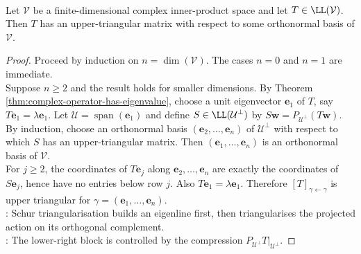 \begin{theorem} \label{thm:schur-triangularization} \\
Let $\mathcal{V}$ be a finite-dimensional complex inner-product space and let $T\in\LL(\mathcal{V})$. Then $T$ has an upper-triangular matrix with respect to some orthonormal basis of $\mathcal{V}$.
\begin{proof}
Proceed by induction on $n=\dim(\mathcal{V})$. The cases $n=0$ and $n=1$ are immediate.\\
Suppose $n\geq2$ and the result holds for smaller dimensions. By Theorem \ref{thm:complex-operator-has-eigenvalue}, choose a unit eigenvector $\mathbf{e}_1$ of $T$, say $T\mathbf{e}_1=\lambda\mathbf{e}_1$. Let $\mathcal{U}=\operatorname{span}(\mathbf{e}_1)$ and define $S\in\LL(\mathcal{U}^{\perp})$ by $S\mathbf{w}=P_{\mathcal{U}^{\perp}}(T\mathbf{w})$.\\
By induction, choose an orthonormal basis $(\mathbf{e}_2,\ldots,\mathbf{e}_n)$ of $\mathcal{U}^{\perp}$ with respect to which $S$ has an upper-triangular matrix. Then $(\mathbf{e}_1,\ldots,\mathbf{e}_n)$ is an orthonormal basis of $\mathcal{V}$.\\
For $j\geq2$, the coordinates of $T\mathbf{e}_j$ along $\mathbf{e}_2,\ldots,\mathbf{e}_n$ are exactly the coordinates of $S\mathbf{e}_j$, hence have no entries below row $j$. Also $T\mathbf{e}_1=\lambda\mathbf{e}_1$. Therefore $[T]_{\gamma\leftarrow\gamma}$ is upper triangular for $\gamma=(\mathbf{e}_1,\ldots,\mathbf{e}_n)$.\\
: Schur triangularisation builds an eigenline first, then triangularises the projected action on its orthogonal complement.\\
: The lower-right block is controlled by the compression $P_{\mathcal{U}^{\perp}}T|_{\mathcal{U}^{\perp}}$.
\end{proof}
\end{theorem}

